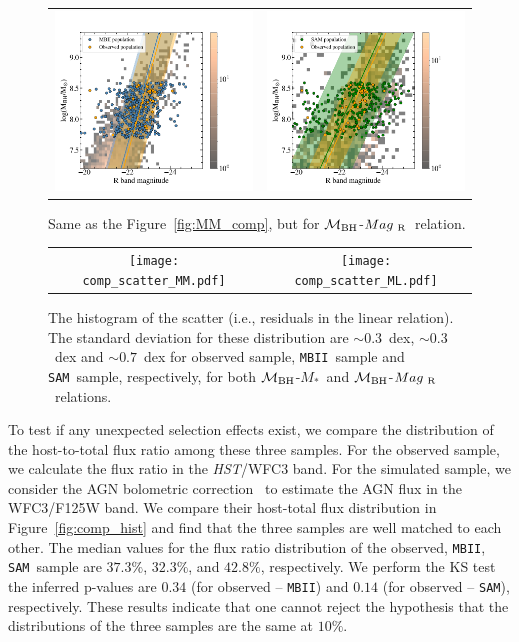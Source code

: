 \documentclass[twocolumn,trackchanges]{aastex63}
\newcommand{\hst}{{\it HST}}
\newcommand{\mbh}{$\mathcal M_{\rm BH}$}
\newcommand{\mr}{$Mag_{\rm ~R}$}
\newcommand{\mstar}{{$M_*$}}
\newcommand{\sam}{\texttt{SAM}}
\newcommand{\mbii}{\texttt{MBII}}
\begin{document}
\begin{figure}[t]%
\begin{tabular}{c c}
\includegraphics[trim = 0mm 0mm 61mm 0mm, clip, width=0.47\linewidth]{MBII_ML.png} &
\includegraphics[trim = 0mm 0mm 61mm 0mm, clip, width=0.47\linewidth]{SAM_ML_consider_nois.png} \\
\end{tabular}
\caption{Same as the Figure~\ref{fig:MM_comp}, but for \mbh-\mr\ relation.}
\label{fig:ML_comp}
\end{figure}


\begin{figure}[t]%
\begin{tabular}{c c}
\texttt{[image: comp\_scatter\_MM.pdf]} &
\texttt{[image: comp\_scatter\_ML.pdf]} \\
\end{tabular}
\caption{The histogram of the scatter (i.e., residuals in the linear relation). The standard deviation for these distribution are $\sim0.3$~dex, $\sim0.3$~dex and $\sim0.7$~dex for observed sample, \mbii\ sample and \sam\ sample, respectively, for both \mbh-\mstar\ and \mbh-\mr\ relations.
}
\label{fig:offset_comp}
\end{figure}

To test if any unexpected selection effects exist, we compare the distribution of the host-to-total flux ratio among these three samples. For the observed sample, we calculate the flux ratio in the \hst/WFC3 band. For the simulated sample, we consider the AGN bolometric correction~\citep{Elvis1994} to estimate the AGN flux in the WFC3/F125W band. We compare their host-total flux distribution in Figure~\ref{fig:comp_hist} and find that the three samples are well matched to each other. The median values for the flux ratio distribution of the observed, \mbii, \sam\ sample are $37.3\%$, $32.3\%$, and $42.8\%$, respectively. We perform the KS test the inferred p-values are $0.34$ (for observed -- \mbii) and $0.14$ (for observed -- \sam), respectively. These results indicate that one cannot reject the hypothesis that the distributions of the three samples are the same at $10\%$.
\end{document}
